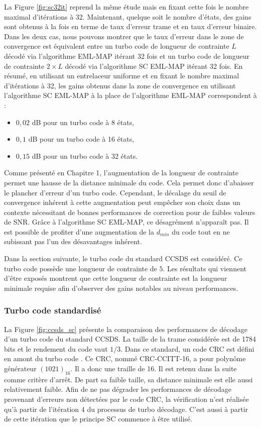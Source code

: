 La Figure \ref{fig:sc32it} reprend la même étude mais en fixant cette fois le nombre maximal d'itérations à 32. Maintenant,
quelque soit le nombre d'états, des gains sont obtenus à la fois en terme de taux d'erreur trame et en taux d'erreur binaire.\\
Dans les deux cas, nous pouvons montrer que le taux d'erreur dans le zone de convergence est équivalent entre un turbo code de  
longueur de contrainte $L$ décodé via l'algorithme EML-MAP itérant 32 fois et un turbo code de longueur de contrainte 
$2\times L$ décodé via l'algorithme SC EML-MAP itérant 32 fois. En résumé, en utilisant un entrelaceur uniforme et en 
fixant le nombre maximal d'itérations à 32, les gains obtenus dans la zone de convergence en utilisant l'algorithme SC 
EML-MAP à la place de l'algorithme EML-MAP correspondent à :
\begin{itemize}
	\item $0,02$ dB pour un turbo code à 8 états,
	\item $0,1$ dB pour un turbo code à 16 états,
	\item $0,15$ dB pour un turbo code à 32 états. \\
\end{itemize}

Comme présenté en Chapitre 1, l'augmentation de la longueur de contrainte permet une hausse de la distance minimale du code.
Cela permet donc d'abaisser le plancher d'erreur d'un turbo code. Cependant, le décalage du seuil de 
convergence inhérent à cette augmentation peut empêcher son choix dans un contexte nécessitant de bonnes performances de 
correction pour de faibles valeurs de SNR. Grâce 
à l’algorithme SC EML-MAP, ce désagrément n’apparaît pas. Il est possible de profiter d'une augmentation de la 
$d_{min}$ du code tout en ne subissant pas l'un des désavantages inhérent.

Dans la section suivante, le turbo code du standard CCSDS est considéré. Ce turbo code possède une longueur de 
contrainte de $5$. Les résultats qui viennent d'être exposés montrent que cette longueur de contrainte est la 
longueur minimale requise afin d'observer des gains notables au niveau performances. 

\subsubsection{Turbo code standardisé}
La Figure \ref{fig:ccsds_sc} présente la comparaison des performances de décodage d'un turbo code du standard CCSDS. 
La taille de la trame considérée est de 1784 bits et le rendement du code vaut $1/3$. Dans ce standard, un code CRC est 
défini en amont du turbo code \cite{ccsdsBluebook}. Ce CRC, nommé CRC-CCITT-16, a pour polynôme générateur $(1021)_{16}$. 
Il a donc une traille de 16. Il est retenu dans la suite comme critère d'arrêt. De part sa faible taille, sa distance 
minimale est elle aussi relativement faible. Afin de ne pas dégrader les performances de décodage provenant d'erreurs 
non détectées par le code CRC, la vérification n'est réalisée qu'à partir de l'itération 4 du processus de turbo décodage.
C'est aussi à partir de cette itération que le principe SC commence à être utilisé.

